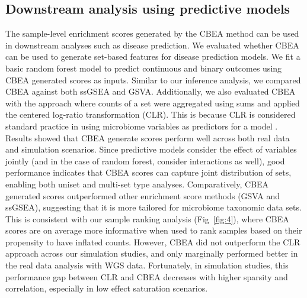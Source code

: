 \subsection{Downstream analysis using predictive models}
The sample-level enrichment scores generated by the CBEA method can be used in downstream analyses such as disease prediction. We evaluated whether CBEA can be used to generate set-based features for disease prediction models. 
We fit a basic random forest model \cite{breiman2001} to predict continuous and binary outcomes using CBEA generated scores as inputs. Similar to our inference analysis, we compared CBEA against both ssGSEA and GSVA. Additionally, we also evaluated CBEA with the approach where counts of a set were aggregated using sums and applied the centered log-ratio transformation (CLR). This is because CLR is considered standard practice in using microbiome variables as predictors for a model \cite{gloor2017}. Results showed that CBEA generate scores perform well across both real data and simulation scenarios. Since predictive models consider the effect of variables jointly (and in the case of random forest, consider interactions as well), good performance indicates that CBEA scores can capture joint distribution of sets, enabling both uniset and multi-set type analyses. Comparatively, CBEA generated scores outperformed other enrichment score methods (GSVA and ssGSEA), suggesting that it is more tailored for microbiome taxonomic data sets. This is consistent with our sample ranking analysis (Fig~\ref{fig:4}), where CBEA scores are on average more informative when used to rank samples based on their propensity to have inflated counts. However, CBEA did not outperform the CLR approach across our simulation studies, and only marginally performed better in the real data analysis with WGS data. Fortunately, in simulation studies, this performance gap between CLR and CBEA decreases with higher sparsity and correlation, especially in low effect saturation scenarios.  
